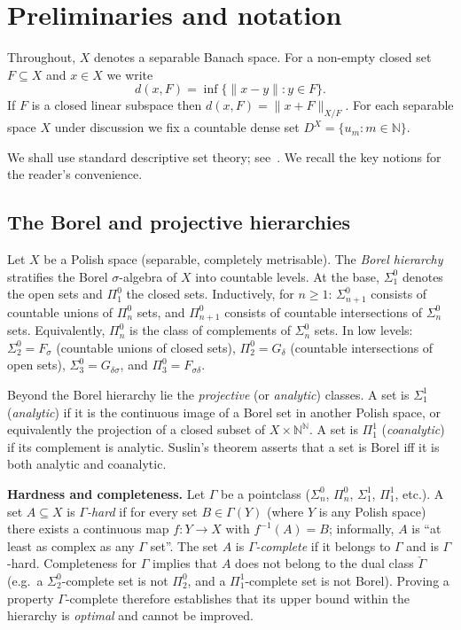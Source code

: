 \documentclass[12pt,fleqn,a4paper]{amsart}
\renewcommand{\ge}{\geqslant}
\numberwithin{equation}{section}
\theoremstyle{definition}
\newcommand{\N}{\mathbb{N}}
\begin{document}
\section{Preliminaries and notation}
\label{sec:prelim}

Throughout, $X$ denotes a separable Banach space.  For a non-empty closed set
$F\subseteq X$ and $x\in X$ we write
\[
d(x,F)=\inf\{\|x-y\|:y\in F\}.
\]
If $F$ is a closed linear subspace then $d(x,F)=\|x+F\|_{X/F}$.
For each separable space $X$ under discussion we fix a countable dense set
$D^X=\{u_m:m\in\N\}$.

We shall use standard descriptive set theory; see~\cite{Kechris,BeckerKechris,GaoDST}.
We recall the key notions for the reader's convenience.

\subsection{The Borel and projective hierarchies}\label{subsec:borel-hierarchy}

Let $X$ be a Polish space (separable, completely metrisable).
The \emph{Borel hierarchy} stratifies the Borel $\sigma$-algebra of $X$ into
countable levels.  At the base,
$\Sigma^0_1$ denotes the open sets and $\Pi^0_1$ the closed sets.
Inductively, for $n\ge 1$:
$\Sigma^0_{n+1}$ consists of countable unions of $\Pi^0_n$ sets, and
$\Pi^0_{n+1}$ consists of countable intersections of $\Sigma^0_n$ sets.
Equivalently, $\Pi^0_n$ is the class of complements of $\Sigma^0_n$ sets.
In low levels:
$\Sigma^0_2 = F_\sigma$ (countable unions of closed sets),
$\Pi^0_2 = G_\delta$ (countable intersections of open sets),
$\Sigma^0_3 = G_{\delta\sigma}$, and $\Pi^0_3 = F_{\sigma\delta}$.

Beyond the Borel hierarchy lie the \emph{projective} (or \emph{analytic}) classes.
A set is $\Sigma^1_1$ (\emph{analytic}) if it is the continuous image of a Borel set
in another Polish space, or equivalently the projection of a closed subset of
$X\times\N^\N$.  A set is $\Pi^1_1$ (\emph{coanalytic}) if its complement is analytic.
Suslin's theorem asserts that a set is Borel iff it is both analytic and coanalytic.

\smallskip
\noindent\textbf{Hardness and completeness.}
Let $\Gamma$ be a pointclass ($\Sigma^0_n$, $\Pi^0_n$, $\Sigma^1_1$, $\Pi^1_1$, etc.).
A set $A\subseteq X$ is \emph{$\Gamma$-hard} if for every set $B\in\Gamma(Y)$ (where $Y$
is any Polish space) there exists a continuous map $f:Y\to X$ with $f^{-1}(A)=B$;
informally, $A$ is ``at least as complex as any $\Gamma$ set''.
The set $A$ is \emph{$\Gamma$-complete} if it belongs to $\Gamma$ and is $\Gamma$-hard.
Completeness for $\Gamma$ implies that $A$ does not belong to the dual class
$\check\Gamma$ (e.g.\ a $\Sigma^0_2$-complete set is not $\Pi^0_2$, and a
$\Pi^1_1$-complete set is not Borel).
Proving a property $\Gamma$-complete therefore establishes that its upper bound
within the hierarchy is \emph{optimal} and cannot be improved.
\end{document}
